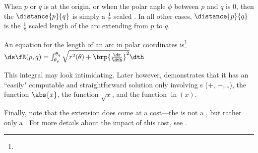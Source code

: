 When $p$ or $q$ is at the origin, or when the polar angle $\phi$ between $p$ and $q$ is $0$, 
then the  $\distance{p}{q}$ is simply a $\frac{1}{\pi}$ scaled  
.
In all other cases, $\distance{p}{q}$ is the $\frac{1}{\pi}$ scaled length of the 
 arc extending from $p$ to $q$.

An equation for the length of an arc in polar coordinates is\footnote{
    }
    \\\indentx$\ds\fR(p,q) = \int_{\theta_p}^{\theta_q} \sqrt{r^2(\theta) + \brp{\frac{\dr}{\dth}}^2}\dth $

This integral may look intimidating.
Later however,  demonstrates that it has an ``easily" computable and straightforward solution 
only involving s ($+$, $-$,\ldots), 
        the  function $\abs{x}$, 
        the  function $\sqrt{x}$, and
        the  function $\ln(x)$.

Finally, note that the extension does come at a cost---the  is not a  , 
        but rather only a  .
        For more details about the impact of this cost, see .


